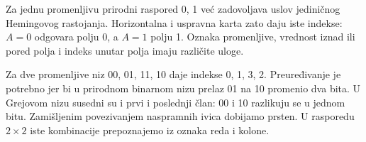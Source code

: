 
Za jednu promenljivu prirodni raspored 0, 1 već zadovoljava uslov jediničnog Hemingovog rastojanja. Horizontalna i uspravna karta zato daju iste indekse: \(A=0\) odgovara polju 0, a \(A=1\) polju 1. Oznaka promenljive, vrednost iznad ili pored polja i indeks unutar polja imaju različite uloge.

Za dve promenljive niz 00, 01, 11, 10 daje indekse 0, 1, 3, 2. Preuređivanje je potrebno jer bi u prirodnom binarnom nizu prelaz 01 na 10 promenio dva bita. U Grejovom nizu susedni su i prvi i poslednji član: 00 i 10 razlikuju se u jednom bitu. Zamišljenim povezivanjem naspramnih ivica dobijamo prsten. U rasporedu \(2\times2\) iste kombinacije prepoznajemo iz oznaka reda i kolone.
